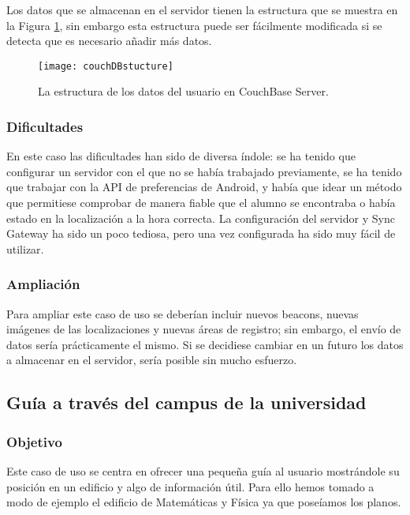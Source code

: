 Los datos que se almacenan en el servidor tienen la estructura que se muestra en la Figura \ref{fig:couchDBstucture}, sin embargo esta estructura puede ser fácilmente modificada si se detecta que es necesario añadir más datos.

\begin{figure}[H]
	\centering
	\texttt{[image: couchDBstucture]}
	\caption{La estructura de los datos del usuario en CouchBase Server.}
	\label{fig:couchDBstucture}
\end{figure}


\subsubsection{Dificultades}

En este caso las dificultades han sido de diversa índole: se ha tenido que configurar un servidor con el que no se había trabajado previamente, se ha tenido que trabajar con la API de preferencias de Android, y había que idear un método que permitiese comprobar de manera fiable que el alumno se encontraba o había estado en la localización a la hora correcta. La configuración del servidor y Sync Gateway ha sido un poco tediosa, pero una vez configurada ha sido muy fácil de utilizar.


\subsubsection{Ampliación}

Para ampliar este caso de uso se deberían incluir nuevos beacons, nuevas imágenes de las localizaciones y nuevas áreas de registro; sin embargo, el envío de datos sería prácticamente el mismo. Si se decidiese cambiar en un futuro los datos a almacenar en el servidor, sería posible sin mucho esfuerzo.

\subsection{Guía a través del campus de la universidad}

\subsubsection{Objetivo}

Este caso de uso se centra en ofrecer una pequeña guía al usuario mostrándole su posición en un edificio y algo de información útil. Para ello hemos tomado a modo de ejemplo el edificio de Matemáticas y Física ya que poseíamos los planos. 

